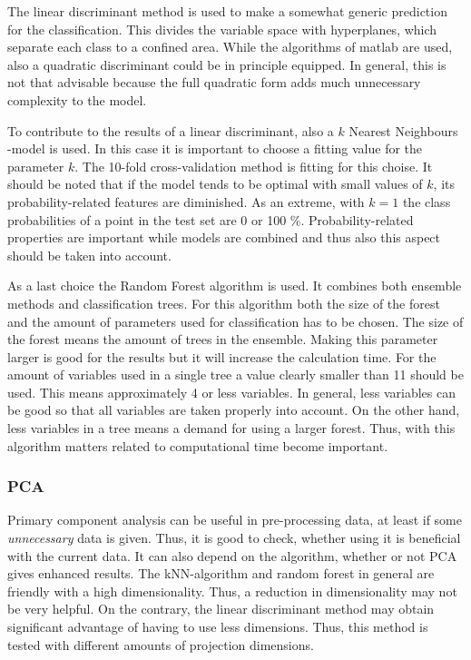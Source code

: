 \documentclass[twoside]{article}
\begin{document}
\begin{multicols}{2}
The linear discriminant method is used to make a somewhat generic prediction for the classification. This divides the variable space
with hyperplanes, which separate each class to a confined area. While the algorithms of matlab are used, also a quadratic discriminant
could be in principle equipped. In general, this is not that advisable because the full quadratic form adds much unnecessary complexity
to the model.

To contribute to the results of a linear discriminant, also a $k$ Nearest Neighbours -model is used. In this case it is important to choose
a fitting value for the parameter $k$. The 10-fold cross-validation method is fitting for this choise. It should be noted that if the model
tends to be optimal with small values of $k$, its probability-related features are diminished. As an extreme, with $k=1$ the class probabilities
of a point in the test set are 0 or 100 $\%$. Probability-related properties are important while models are combined and thus also this aspect
should be taken into account.

As a last choice the Random Forest algorithm is used. It combines both ensemble methods and classification trees. For this algorithm both the size
of the forest and the amount of parameters used for classification has to be chosen. The size of the forest means the amount of trees in the ensemble.
Making this parameter larger is good for the results but it will increase the calculation time. For the amount of variables used in a single tree a
value clearly smaller than 11 should be used. This means approximately 4 or less variables. In general, less variables can be good so that
all variables are taken properly into account. On the other hand, less variables in a tree means a demand for using a larger forest. Thus,
with this algorithm matters related to computational time become important.

\subsubsection{PCA}

Primary component analysis can be useful in pre-processing data, at least if some \emph{unnecessary} data is given. Thus, it is good to check, whether
using it is beneficial with the current data. It can also depend on the algorithm, whether or not PCA gives enhanced results. The kNN-algorithm and random
forest in general are friendly with a high dimensionality. Thus, a reduction in dimensionality may not be very helpful. On the contrary, the linear discriminant
method may obtain significant advantage of having to use less dimensions. Thus, this method is tested with different amounts of projection dimensions.


\end{multicols}
\end{document}
